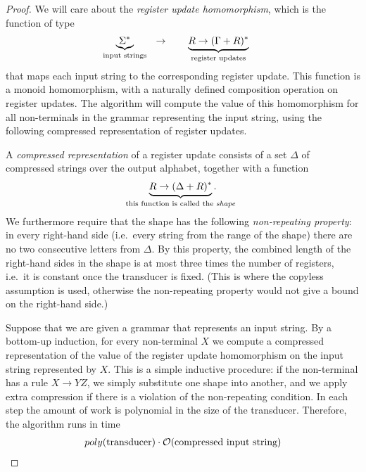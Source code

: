 \documentclass{article}
\begin{document}
\begin{proof}
     We will care about the \emph{register update homomorphism}, which is  the function  of type
    \begin{align*}
    \myunderbrace{\Sigma^*}{input strings} 
    \qquad \to  \qquad 
    \myunderbrace{R \to (\Gamma + R)^*}{register updates}
    \end{align*}
    that maps each input string to the corresponding register update. This function is  a monoid homomorphism, with a naturally defined composition operation on register updates. The algorithm will compute the value of this homomorphism for all non-terminals in the grammar representing the input string, using the following compressed representation of register updates.

    A \emph{compressed representation} of a register update consists of a set $\Delta$ of compressed strings over the output alphabet, together with a function
    \begin{align*}
    \myunderbrace{R \to (\Delta + R)^*}{this function is called the \emph{shape}}.
    \end{align*}
    We furthermore require that the shape has the following \emph{non-repeating property}: in every right-hand side (i.e.~every string from the range of the shape) there are no two consecutive letters from $\Delta$. By this property, the combined length of the right-hand sides in the shape is at most three times the number of registers, i.e.~it is constant once the transducer is fixed.  (This is where the copyless assumption is used, otherwise the non-repeating property would not give a bound on the right-hand side.)
    
    Suppose that we are given a grammar that represents an input string. By a bottom-up induction, for every non-terminal $X$ we  compute a compressed representation  of the value of the register update homomorphism on the input string represented by $X$.  This is a simple inductive  procedure: if the non-terminal has a rule $X \to YZ$,  we simply substitute one shape into another, and we apply extra compression if there is a violation of the non-repeating condition. In each step the amount of work is polynomial in the size of the transducer. Therefore, the algorithm runs in time 
    \begin{align*}
    poly(\text{transducer}) \cdot {\mathcal O}(\text{compressed input string})
    \end{align*}
\end{proof}
\end{document}
